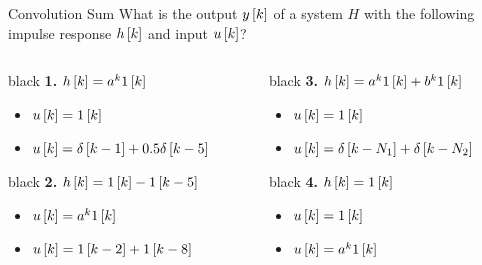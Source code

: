 \documentclass[aspectratio=169]{beamer}
\def\ls{\ensuremath\left[}
\def\rs{\ensuremath\right]}
\newcommand{\demoexc}[3]{\onslide<#1->\begin{color}{#2} #3 \end{color}}
\begin{document}
\begin{frame}{Convolution Sum}
What is the output $y\ls k\rs$ of a system $H$ with the following impulse response $h\ls k\rs$ and input $u\ls k\rs$?
\vspace{0.3cm}
\begin{columns}
\begin{column}{0.45\textwidth}
\demoexc{1}{black}{\textbf{1. }$h\ls k\rs = a^k1\ls k\rs$
\begin{itemize}
    \item $u\ls k\rs = 1\ls k\rs$
    \item $u\ls k\rs = \delta\ls k - 1\rs + 0.5 \delta\ls k - 5\rs$
\end{itemize}
}
\vspace{0.3cm}
\demoexc{2}{black}{\textbf{2. }$h\ls k\rs = 1\ls k\rs - 1\ls k - 5\rs$
\begin{itemize}
    \item $u\ls k\rs = a^{k}1\ls k\rs$
    \item $u\ls k\rs = 1\ls k - 2\rs + 1\ls k - 8\rs$
\end{itemize}
}
\end{column}

\begin{column}{0.5\textwidth}
\demoexc{3}{black}{\textbf{3. }$h\ls k\rs = a^k1\ls k\rs + b^k1\ls k\rs$
\begin{itemize}
    \item $u\ls k\rs = 1\ls k\rs$
    \item $u\ls k\rs = \delta\ls k - N_1\rs + \delta\ls k - N_2\rs$
\end{itemize}
}
\vspace{0.3cm}
\demoexc{4}{black}{\textbf{4. }$h\ls k\rs = 1\ls k\rs$
\begin{itemize}
    \item $u\ls k\rs = 1\ls k\rs$
    \item $u\ls k\rs = a^{k}1\ls k\rs$
\end{itemize}
}
\end{column}
\end{columns}
\end{frame}
\end{document}
